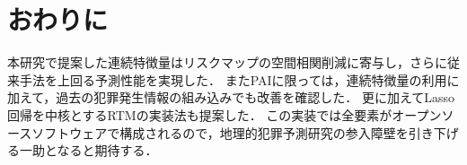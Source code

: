 \section{おわりに}
本研究で提案した連続特徴量はリスクマップの空間相関削減に寄与し，さらに従来手法を上回る予測性能を実現した．
またPAIに限っては，連続特徴量の利用に加えて，過去の犯罪発生情報の組み込みでも改善を確認した．
更に加えてLasso回帰を中核とするRTMの実装法も提案した．
この実装では全要素がオープンソースソフトウェアで構成されるので，地理的犯罪予測研究の参入障壁を引き下げる一助となると期待する．





% 
% 

